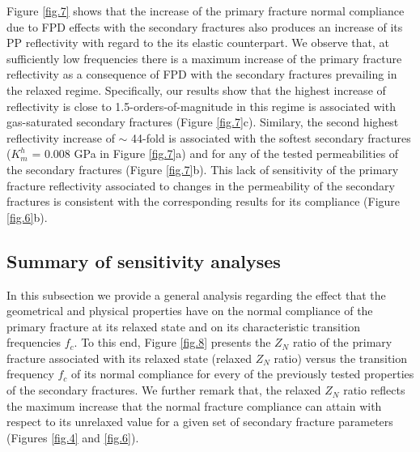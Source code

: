 \documentclass[draft]{agujournal2019}
\begin{document}
Figure \ref{fig.7} shows that the increase of the primary fracture normal compliance due to FPD effects with the secondary fractures also produces an increase of its PP reflectivity with regard to the its elastic counterpart. We observe that, at sufficiently low frequencies there is a maximum increase of the primary fracture reflectivity as a consequence of FPD with the secondary fractures prevailing in the relaxed regime. Specifically, our results show that the highest increase of reflectivity is close to 1.5-orders-of-magnitude in this regime is associated with gas-saturated secondary fractures (Figure \ref{fig.7}c). Similary, the second highest reflectivity increase of $\sim$ 44-fold is associated with the softest secondary fractures ($K_m^h$ = 0.008 GPa in Figure \ref{fig.7}a) and for any of the tested permeabilities of the secondary fractures (Figure \ref{fig.7}b). This lack of sensitivity of the primary fracture reflectivity associated to changes in the permeability of the secondary fractures is consistent with the corresponding results for its compliance (Figure \ref{fig.6}b).  


\subsection{Summary of sensitivity analyses}
In this subsection we provide a general analysis regarding the effect that the geometrical and physical properties have on the normal compliance of the primary fracture at its relaxed state and on its characteristic transition frequencies $f_c$. To this end, Figure \ref{fig.8} presents the $Z_N$ ratio of the primary fracture associated with its relaxed state  (relaxed $Z_N$ ratio) versus the transition frequency $f_c$ of its normal compliance
for every of the previously tested properties of the secondary fractures. We further remark that, the relaxed $Z_N$ ratio reflects the maximum increase that the normal fracture compliance can attain with respect to its unrelaxed value for a given set of secondary fracture parameters (Figures \ref{fig.4} and  \ref{fig.6}).
\end{document}
